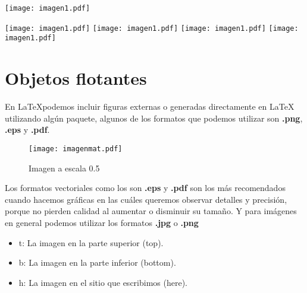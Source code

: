 \documentclass[12pt]{article}
\begin{document}
\begin{center}
\texttt{[image: imagen1.pdf]}
\end{center}

\begin{center}
\texttt{[image: imagen1.pdf]} \quad
\texttt{[image: imagen1.pdf]} \quad
\texttt{[image: imagen1.pdf]} \quad
\texttt{[image: imagen1.pdf]}
\end{center}

\newpage
\section{Objetos flotantes}
En \LaTeX podemos incluir figuras externas o generadas directamente en \LaTeX \, utilizando algún paquete, algunos de los formatos que podemos utilizar son \textbf{.png}, \textbf{.eps} y \textbf{.pdf}. \\[0.5cm]

\begin{figure}[!ht] %
\centering %
\texttt{[image: imagenmat.pdf]}
\caption{Imagen a escala 0.5} %
\label{figura1}
\end{figure}

Los formatos vectoriales como los son \textbf{.eps} y \textbf{.pdf} son los más recomendados cuando hacemos gráficas en las cuáles queremos observar detalles y precisión, porque no pierden calidad al aumentar o disminuir su tamaño. Y para imágenes en general podemos utilizar los formatos \textbf{.jpg} o \textbf{.png}


\begin{itemize}
\item t: La imagen en la parte superior (top).
\item b: La imagen en la parte inferior (bottom).
\item h: La imagen en el sitio que escribimos (here).
\end{itemize}
\end{document}
